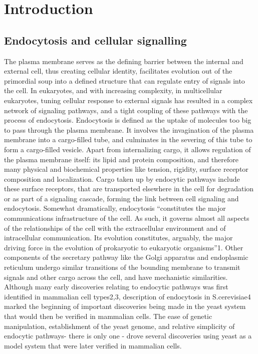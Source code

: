\chapter{Introduction} %

\label{Ch:Aims} %

\section{Endocytosis and cellular signalling}
The plasma membrane serves as the defining barrier between the internal and external cell, thus creating cellular identity, facilitates evolution out of the primordial soup into a defined structure that can regulate entry of signals into the cell. In eukaryotes, and with increasing complexity, in multicellular eukaryotes, tuning cellular response to external signals has resulted in a complex network of signaling pathways, and a tight coupling of these pathways with the process of endocytosis. Endocytosis is defined as the uptake of molecules too big to pass through the plasma membrane. It involves the invagination of the plasma membrane into a cargo-filled tube, and culminates in the severing of this tube to form a cargo-filled vesicle. Apart from internalizing cargo, it allows regulation of the plasma membrane itself: its lipid and protein composition, and therefore many physical and biochemical properties like tension, rigidity, surface receptor composition and localization. Cargo taken up by endocytic pathways include these surface receptors, that are transported elsewhere in the cell for degradation or as part of a signaling cascade, forming the link between cell signaling and endocytosis.  
Somewhat dramatically, endocytosis “constitutes the major communications infrastructure of the cell. As such, it governs almost all aspects of the relationships of the cell with the extracellular environment and of intracellular communication. Its evolution constitutes, arguably, the major driving force in the evolution of prokaryotic to eukaryotic organisms”1. 
Other components of the secretary pathway like the Golgi apparatus and endoplasmic reticulum undergo similar transitions of the bounding membrane to transmit signals and other cargo across the cell, and have mechanistic similarities. 
Although many early discoveries relating to endocytic pathways was first identified in mammalian cell types2,3, description of endocytosis in S.cerevisiae4 marked the beginning of important discoveries being made in the yeast system that would then be verified in mammalian cells. The ease of genetic manipulation, establishment of the yeast genome, and relative simplicity of endocytic pathways- there is only one -
 drove several discoveries using yeast as a model system that were later verified in mammalian cells.


